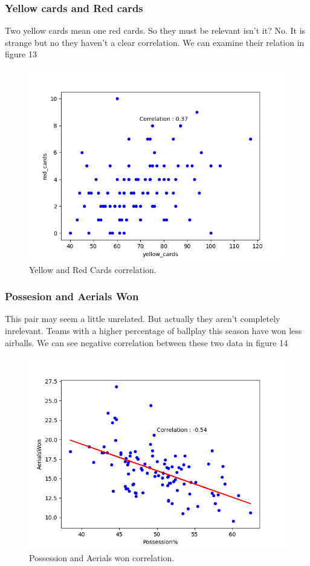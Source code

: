 \documentclass[conference]{IEEEtran}
\begin{document}
\subsubsection{Yellow cards and Red cards}
Two yellow cards mean one red cards. So they must be relevant isn't it? No. It is strange but no they haven't a clear correlation. We can examine their relation in figure 13

\begin{figure}[h]
  \includegraphics[width=\linewidth]{yellow_red_corr.png}
  \caption{Yellow and Red Cards correlation.}
  \label{fig:yellow_red}
\end{figure}

\subsubsection{Possesion and Aerials Won}
This pair may seem a little unrelated. But actually they aren't completely inrelevant. Teams with a higher percentage of ballplay this season have won less airballs. We can see negative correlation between these two data in figure 14

\begin{figure}[h]
  \includegraphics[width=\linewidth]{poss_aerials_corr.png}
  \caption{Possession and Aerials won correlation.}
  \label{fig:poss_aerials_corr}
\end{figure}
\end{document}

